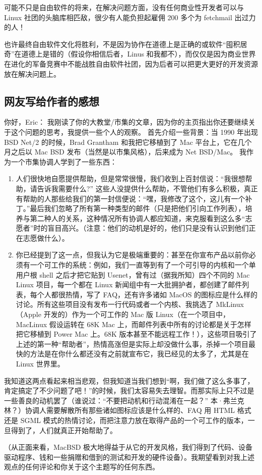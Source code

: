 可能不只是自由软件的将来，在解决问题方面，没有任何商业性开发者可以与 Linux 社团的头脑库相匹敌，很少有人能负担起雇佣 200 多个为 fetchmail 出过力的人！


也许最终自由软件文化将胜利，不是因为协作在道德上是正确的或软件“囤积居奇”在道德上是错的（假设你相信后者，Linus 和我都不），而仅仅是因为商业世界在进化的军备竞赛中不能战胜自由软件社团，因为后者可以把更大更好的开发资源放在解决问题上。

\subsection{网友写给作者的感想}

你好，Eric：
我刚读了你的大教堂/市集的文章，因为你的主页指出你还要继续关于这个问题的思考，我提供一些个人的观察。 首先介绍一些背景：当 1990 年出现 BSD Net/2 的时候，Brad Grantham 和我把它移植到了 Mac 平台上，它在几个月之后以 Mac BSD 发布（当然是以市集风格），后来成为 Net BSD/Mac。 我作为一个市集协调人学到了一些东西：

\begin{enumerate}
\item 人们很快地自愿提供帮助，但是常常很慢，我们收到上百封信说：“我很想帮助，请告诉我需要什么?” 这些人没提供什么帮助，不管他们有多么积极，真正有帮助的人那些给我们的第一封信便说：“嘿，我修改了这个，这儿有一个补丁。”最后我们忽略了所有第一种类型的邮件（只是把他们引向工作列表），培养与第二种人的关系，这种情况所有协调人都应知道，来克服看到这么多“志愿者”时的盲目高兴。（注意：他们的动机是好的，他们只是没有认识到他们正在志愿做什么）。

\item 你已经提到了这一点，但我认为它是极端重要的：甚至在你宣布产品以前你必须有一个可工作的系统：例如，我们一直等到有了一个可引导的内核和一个单用户根 shell 之后才把它贴到 Usenet，曾有过（据我所知）四个不同的 Mac Linux 项目，每一个都在 Linux 新闻组中有一大批拥护者，都创建了邮件列表，每个人都很热情，写了 FAQ，还有许多诸如 MacOS 的图标应是什么样的讨论。所有这些项目没有发布一行代码或者一个内核、我挑选了 MkLinux（Apple 开发的）作为一个可工作的 Mac 版 Linux（在一个项目中，MacLinux 假设运转在 68K Mac 上，而邮件列表中所有的讨论都是关于怎样把它移植到 Power Mac 上。68K 版本甚至不能远程工作！），这些项目吸引了上述的第一种“帮助者”，热情高涨但是实际上却没做什么事，杀掉一个项目最快的方法是在你什么都还没有之前就宣布它，我已经见的太多了，尤其是在 Linux 世界里。
\end{enumerate}

我知道这两点看起来相当悲观，但我知道当我们想到“啊，我们做了这么多事了，肯定搞定了不少问题了吧！”的时候，我们太容易失去理智。而那实际上只不过是一些善良的动机罢了（谁说过：“不要把动机和行动混淆在一起？” 本·弗兰克林？）协调人需要解散所有那些诸如图标应该是什么样的、FAQ 用 HTML 格式还是 SGML 模式的热情讨论，而把注意力放在取得产品的一个可工作的版本，一旦得到了，人们就真正开始帮助了。

（从正面来看，MacBSD 极大地得益于从它的开发风格，我们得到了代码、设备驱动程序、钱和一些捐赠和借到的测试和开发的硬件设备）。我期望看到对我上述观点的任何评论和你关于这个主题写的任何东西。


